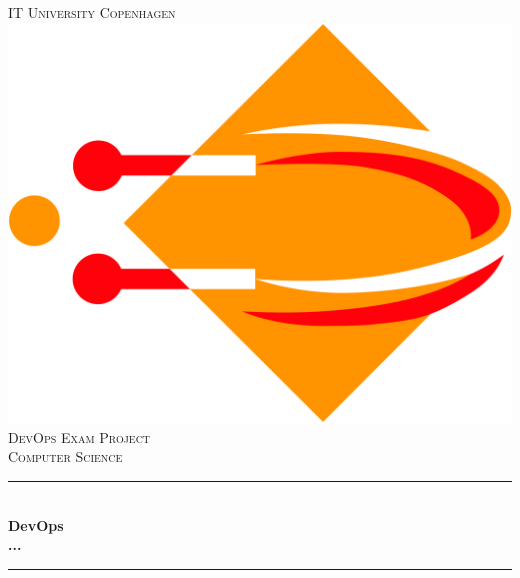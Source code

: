 \begin{titlepage}

\newcommand{\HRule}{\rule{\linewidth}{0.5mm}} %

\center %
 

\textsc{\LARGE IT University Copenhagen}\\[1.5cm] %
\includegraphics[scale=.1]{images/ITU.png}\\[1cm] %
\textsc{\Large DevOps Exam Project}\\[0.5cm] %
\textsc{\large Computer Science}\\[0.5cm] %


\HRule \\[0.4cm]
{ \huge \bfseries DevOps\\...}\\[0.4cm] %
\HRule \\[1.5cm]
 

\end{titlepage}
